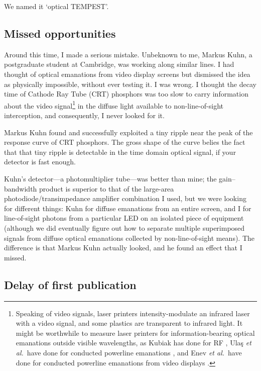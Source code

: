 \documentclass[conference]{IEEEtran}
\begin{document}
We named it `optical TEMPEST'.

\subsection{Missed opportunities}

Around this time, I made a serious mistake. Unbeknown to me, Markus Kuhn, a
postgraduate student at Cambridge, was working along similar lines. I had
thought of optical emanations from video display screens but dismissed the
idea as physically impossible, without ever testing it. I was wrong. I
thought the decay time of Cathode Ray Tube (CRT) phosphors was too slow to
carry information about the video signal\footnote{Speaking of video signals,
laser printers intensity-modulate an infrared laser with a video signal, and
some plastics are transparent to infrared light. It might be worthwhile to
measure laser printers for information-bearing optical emanations outside
visible wavelengths, as Kubiak has done for RF
\cite{Kubiak2014,Kubiak2017,Kubiak2017b,Kubiak2017c}, Ula\c{s} {\it et al.}\
have done for conducted powerline emanations \cite{Ulas2016}, and Enev {\it
et al.}\ have done for conducted powerline emanations from video displays
\cite{Enev2011}.} in the diffuse light available to non-line-of-sight
interception, and consequently, I never looked for it.

Markus Kuhn found and successfully exploited a tiny ripple near the peak of
the response curve of CRT phosphors. The gross shape of the curve belies the
fact that that tiny ripple is detectable in the time domain optical signal,
if your detector is fast enough.

Kuhn's detector---a photomultiplier tube---was better than mine; the
gain--bandwidth product is superior to that of the large-area
photodiode/transimpedance amplifier combination I used, but we were looking
for different things: Kuhn for diffuse emanations from an entire screen, and
I for line-of-sight photons from a particular LED on an isolated piece of
equipment (although we did eventually figure out how to separate multiple
superimposed signals from diffuse optical emanations collected by
non-line-of-sight means). The difference is that Markus Kuhn actually looked,
and he found an effect that I missed.

\subsection{Delay of first publication}
\end{document}
